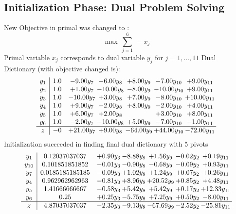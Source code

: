 \documentclass[8pt]{article}
\begin{document}
\subsection{Initialization Phase: Dual Problem Solving}
New Objective in primal was changed to : \[ \max\ \sum_{j=1}^{6}\ - x_j \] 
Primal variable $x_j$ corresponds to dual variable $y_j$ for $j = 1,\ldots,11$
Dual Dictionary (with objective changed is): 
\[\begin{array}{c| c c@{\hskip 2pt} c@{\hskip 2pt} c@{\hskip 2pt} c@{\hskip 2pt} c@{\hskip 2pt} }
 y_{1}   &  1.0 & -9.00 y_{7} & -6.00 y_{8} & +  8.00 y_{9} & -7.00 y_{10} & +  9.00 y_{11}\\
 y_{2}   &  1.0 & +  1.00 y_{7} & -10.00 y_{8} & -8.00 y_{9} & -10.00 y_{10} & +  9.00 y_{11}\\
 y_{3}   &  1.0 & -10.00 y_{7} & +  3.00 y_{8} & +  7.00 y_{9} & -8.00 y_{10} & + 10.00 y_{11}\\
 y_{4}   &  1.0 & +  9.00 y_{7} & -2.00 y_{8} & +  8.00 y_{9} & -2.00 y_{10} & +  4.00 y_{11}\\
 y_{5}   &  1.0 & +  6.00 y_{7} & +  2.00 y_{8} &   & +  3.00 y_{10} & +  8.00 y_{11}\\
 y_{6}   &  1.0 & -2.00 y_{7} & -10.00 y_{8} & +  5.00 y_{9} & -7.00 y_{10} & -1.00 y_{11}\\
\hline
z    &  -0 & + 21.00 y_{7} & +  9.00 y_{8} & -64.00 y_{9} & + 44.00 y_{10} & -72.00 y_{11}\\
\end{array}\]
Initialization succeeded in finding final dual dictionary with 5 pivots
\[\begin{array}{c| c c@{\hskip 2pt} c@{\hskip 2pt} c@{\hskip 2pt} c@{\hskip 2pt} c@{\hskip 2pt} }
 y_{1}   &  0.12037037037 & +  0.90 y_{3} & -8.88 y_{8} & +  1.56 y_{9} & -0.02 y_{2} & +  0.19 y_{11}\\
 y_{10}   &  0.101851851852 & -0.01 y_{3} & -0.90 y_{8} & -0.68 y_{9} & -0.09 y_{2} & +  0.93 y_{11}\\
 y_{7}   &  0.0185185185185 & -0.09 y_{3} & +  1.02 y_{8} & +  1.24 y_{9} & +  0.07 y_{2} & +  0.26 y_{11}\\
 y_{4}   &  0.962962962963 & -0.81 y_{3} & +  8.96 y_{8} & + 20.52 y_{9} & +  0.85 y_{2} & +  4.48 y_{11}\\
 y_{5}   &  1.41666666667 & -0.58 y_{3} & +  5.42 y_{8} & +  5.42 y_{9} & +  0.17 y_{2} & + 12.33 y_{11}\\
 y_{6}   &  0.25 & +  0.25 y_{3} & -5.75 y_{8} & +  7.25 y_{9} & +  0.50 y_{2} & -8.00 y_{11}\\
\hline
z    &  4.87037037037 & -2.35 y_{3} & -9.13 y_{8} & -67.69 y_{9} & -2.52 y_{2} & -25.81 y_{11}\\
\end{array}\]
\end{document}
